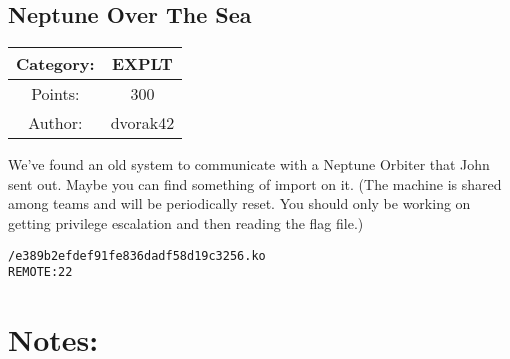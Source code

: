 \begin{center}
\section*{Neptune Over The Sea}
{\large
\begin{tabular}{| c c |}
\hline
Category: & EXPLT\\\hline
Points: & 300\\\hline
Author: & dvorak42\\\hline
\end{tabular}
}
\end{center}
\vspace{0.5in}

{\large
We've found an old system to communicate with a Neptune Orbiter that John sent out. Maybe you can find something of import on it. (The machine is shared among teams and will be periodically reset. You should only be working on getting privilege escalation and then reading the flag file.)
}
\vspace{0.25in}
\begin{center}
  {\Large\tt /e389b2efdef91fe836dadf58d19c3256.ko}\\
  {\Large\tt REMOTE:22}
\end{center}

\vspace{0.25in}
\section*{Notes:}
